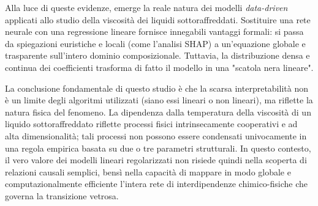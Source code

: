 \documentclass[../main.tex]{subfiles}
\begin{document}
	Alla luce di queste evidenze, emerge la reale natura dei modelli \textit{data-driven} applicati allo studio della viscosità dei liquidi sottoraffreddati. Sostituire una rete neurale con una regressione lineare fornisce innegabili vantaggi formali: si passa da spiegazioni euristiche e locali (come l'analisi SHAP) a un'equazione globale e trasparente sull'intero dominio composizionale. Tuttavia, la distribuzione densa e continua dei coefficienti trasforma di fatto il modello in una "scatola nera lineare".
	
	La conclusione fondamentale di questo studio è che la scarsa interpretabilità non è un limite degli algoritmi utilizzati (siano essi lineari o non lineari), ma riflette la natura fisica del fenomeno. La dipendenza dalla temperatura della viscosità di un liquido sottoraffreddato riflette processi fisici intrinsecamente cooperativi e ad alta dimensionalità; tali processi non possono essere condensati univocamente in una regola empirica basata su due o tre parametri strutturali. In questo contesto, il vero valore dei modelli lineari regolarizzati non risiede quindi nella scoperta di relazioni causali semplici, bensì nella capacità di mappare in modo globale e computazionalmente efficiente l'intera rete di interdipendenze chimico-fisiche che governa la transizione vetrosa.
	
\end{document}
